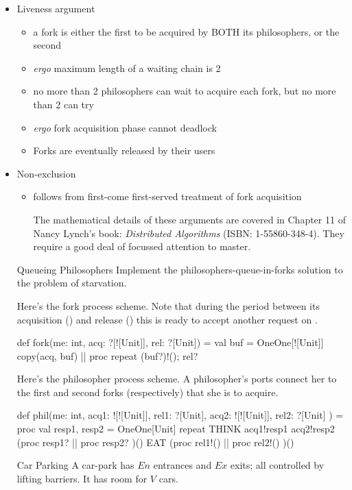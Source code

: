 \documentclass{concdistfoils}
\begin{document}
\begin{slide}
\begin{itemize}
\item Liveness argument 
\begin{itemize}
\item a fork is either the first to be acquired by BOTH its philosophers, or the second
\item[] \textit{ergo} maximum length of a waiting chain is 2
\item no more than 2 philosophers can wait to acquire each fork, but no more than 2 can try
\item[] \textit{ergo} fork acquisition phase cannot deadlock
\item Forks are eventually released by their users
\end{itemize}
\vfill
\item Non-exclusion 
\begin{itemize}
\item follows from first-come first-served treatment of fork acquisition
\begin{note}
The mathematical details of these arguments are covered in Chapter 11 of
Nancy Lynch's book: \textit{Distributed Algorithms} (ISBN: 1-55860-348-4). They require a good
deal of focussed attention to master.
\end{note}
\end{itemize}
\begin{ex**}{Queueing Philosophers}
Implement the philosophers-queue-in-forks solution to the problem of starvation.
\begin{ans}
Here's the fork process scheme. Note that during the period
between its acquisition () and release ()
this is ready to accept another request on .
\begin{scala}
  def fork(me: int, acq: ?[![Unit]], rel: ?[Unit]) = 
  { val buf = OneOne[![Unit]]
    copy(acq, buf) || proc { repeat { (buf?)!(); rel? }}
  }
\end{scala}
Here's the philosopher process scheme. A philosopher's
ports connect her to the first and second forks (respectively) that 
she is to acquire.
\begin{scala}
  def phil(me: int, acq1: ![![Unit]], rel1: ?[Unit],
                    acq2: ![![Unit]], rel2: ?[Unit]
          ) = proc
  { val resp1, resp2 = OneOne[Unit]
    repeat
    { THINK
      acq1!resp1
      acq2!resp2
      (proc { resp1?  } || proc { resp2?  })()
      EAT
      (proc { rel1!() } || proc { rel2!() })()
    }
  }
\end{scala}
\end{ans}
\end{ex**}
\begin{ex**}{Car Parking}
A car-park has $En$ entrances and $Ex$ exits; all controlled by
lifting barriers.  It has room for $V$ cars. 


\end{ex**}
\end{itemize}
\end{slide}
\end{document}
